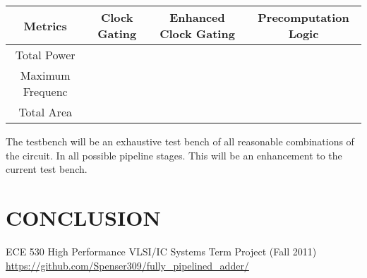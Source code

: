 \documentclass[10pt,letterpaper]{article}
\begin{document}
\begin{center}
\begin{tabular}{|c|c|c|c|}
\hline Metrics & Clock Gating & Enhanced Clock Gating & Precomputation Logic\\
\hline 
\hline Total Power & & & \\
\hline Maximum Frequenc & & & \\
\hline Total Area & & & \\
\hline 
\end{tabular}
\end{center}


The testbench will be an exhaustive test bench of all reasonable combinations of the circuit.  In all possible pipeline stages.  This will be an enhancement to the current test bench.

\section{CONCLUSION}


\begin{thebibliography}{9}

 ECE 530 High Performance VLSI/IC Systems Term Project (Fall 2011)
 \url{https://github.com/Spenser309/fully_pipelined_adder/}

\end{thebibliography}
\end{document}
